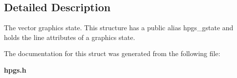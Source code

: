 \subsection{Detailed Description}
The vector graphics state. This structure has a public alias {\ttfamily hpgs\_\-gstate} and holds the line attributes of a graphics state. 

The documentation for this struct was generated from the following file:\begin{DoxyCompactItemize}
\item 
{\bf hpgs.h}\end{DoxyCompactItemize}
